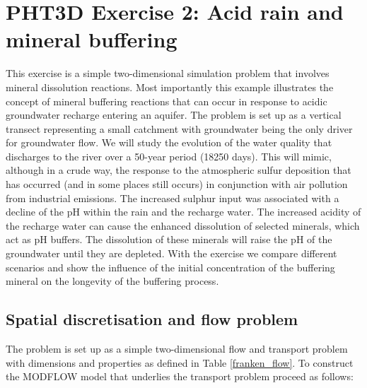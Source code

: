 \section[PHT3D Exercise 2: Mineral buffering Acid rain and mineral buffering]{PHT3D Exercise 2: Acid rain and mineral buffering}


This exercise is a simple two-dimensional simulation problem that involves mineral dissolution reactions. 
Most importantly this example illustrates the concept of mineral buffering reactions that can occur 
in response to acidic groundwater recharge entering an aquifer. 
The problem is set up as a vertical transect representing a small catchment with groundwater being the only driver for groundwater flow. We will study the evolution of the water quality that discharges to the river over a 50-year period (18250 days). This will mimic, although in a crude way, the response to the atmospheric sulfur deposition that has occurred (and in some places still occurs) in conjunction with air pollution from industrial emissions.
The increased sulphur input was associated with a decline of the pH within the rain and the recharge water.
The increased acidity of the recharge water can cause the enhanced dissolution of selected minerals, which act as pH buffers. The dissolution of these minerals will raise the pH of the groundwater until they are depleted. 
With the exercise we compare different scenarios and show the influence of the initial concentration of the buffering mineral on the longevity of the buffering process.

\subsection[Spatial discretisation and flow problem]{Spatial discretisation and flow problem}

The problem is set up as a simple two-dimensional flow and transport problem with dimensions and properties as defined in Table \ref{franken_flow}. To construct the MODFLOW model that underlies the transport problem proceed as follows:



